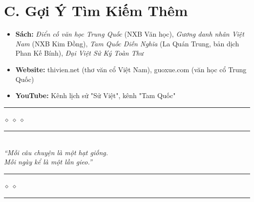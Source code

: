 \ghichu
\ghichu
\ghichu
\ghichu
\ghichu

\section*{C. Gợi Ý Tìm Kiếm Thêm}

\begin{itemize}[leftmargin=2cm]
  \item \textbf{Sách:} \textit{Điển cố văn học Trung Quốc} (NXB Văn học),
        \textit{Gương danh nhân Việt Nam} (NXB Kim Đồng),
        \textit{Tam Quốc Diễn Nghĩa} (La Quán Trung, bản dịch Phan Kế Bính),
        \textit{Đại Việt Sử Ký Toàn Thư}
  \item \textbf{Website:} thivien.net (thơ văn cổ Việt Nam),
        guoxue.com (văn học cổ Trung Quốc)
  \item \textbf{YouTube:} Kênh lịch sử "Sử Việt", kênh "Tam Quốc"
\end{itemize}

\vspace{1cm}

\begin{center}
  {\color{truyengold}\rule{5cm}{1.5pt}\quad\large$\diamond\;\diamond\;\diamond$\quad\rule{5cm}{1.5pt}}\\[0.8cm]
  \textit{\color{truyenblue}``Mỗi câu chuyện là một hạt giống. \\
  Mỗi ngày kể là một lần gieo.''}\\[0.4cm]
  {\color{truyengold}\rule{3cm}{1pt}\quad\large$\diamond\;\diamond$\quad\rule{3cm}{1pt}}
\end{center}
